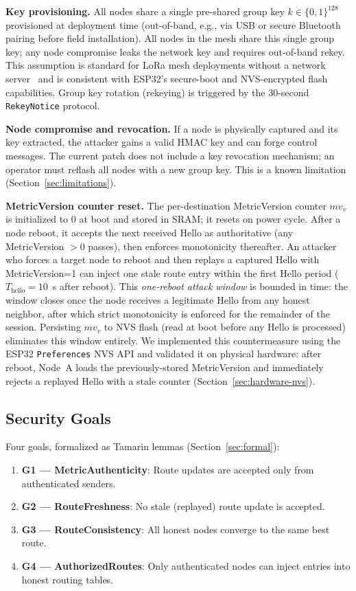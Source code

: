 \documentclass[preprint,12pt]{elsarticle}
\begin{document}
\textbf{Key provisioning.}
All nodes share a single pre-shared group key
$k \in \{0,1\}^{128}$ provisioned at deployment time (out-of-band, e.g.,
via USB or secure Bluetooth pairing before field installation).
All nodes in the mesh share this single group key; any node compromise
leaks the network key and requires out-of-band rekey.
This assumption is standard for LoRa mesh deployments without
a network server~\cite{sole2024-loramesher-dv} and is consistent
with ESP32's secure-boot and NVS-encrypted flash capabilities.
Group key rotation (rekeying) is triggered by the
30-second \texttt{RekeyNotice} protocol.

\textbf{Node compromise and revocation.}
If a node is physically captured and its key extracted,
the attacker gains a valid HMAC key and can forge control messages.
The current patch does not include a key revocation mechanism;
an operator must reflash all nodes with a new group key.
This is a known limitation (Section~\ref{sec:limitations}).

\textbf{MetricVersion counter reset.}
The per-destination MetricVersion counter $mv_v$ is initialized
to 0 at boot and stored in SRAM; it resets on power cycle.
After a node reboot, it accepts the next received Hello as
authoritative (any MetricVersion $> 0$ passes), then enforces
monotonicity thereafter. An attacker who forces a target node
to reboot and then replays a captured Hello with MetricVersion=1
can inject one stale route entry within the first Hello period
($T_{\text{hello}} = 10$~s after reboot). This \emph{one-reboot
attack window} is bounded in time: the window closes once the
node receives a legitimate Hello from any honest neighbor, after
which strict monotonicity is enforced for the remainder of the
session. Persisting $mv_v$ to NVS flash (read at boot before
any Hello is processed) eliminates this window entirely.
We implemented this countermeasure using the ESP32 \texttt{Preferences}
NVS API and validated it on physical hardware: after reboot,
Node~A loads the previously-stored MetricVersion and immediately
rejects a replayed Hello with a stale counter
(Section~\ref{sec:hardware-nvs}).

\subsection{Security Goals}

Four goals, formalized as Tamarin lemmas (Section~\ref{sec:formal}):

\begin{enumerate}
  \item \textbf{G1 — MetricAuthenticity}: Route updates are accepted
    only from authenticated senders.
  \item \textbf{G2 — RouteFreshness}: No stale (replayed) route
    update is accepted.
  \item \textbf{G3 — RouteConsistency}: All honest nodes converge
    to the same best route.
  \item \textbf{G4 — AuthorizedRoutes}: Only authenticated nodes
    can inject entries into honest routing tables.
\end{enumerate}
\end{document}
